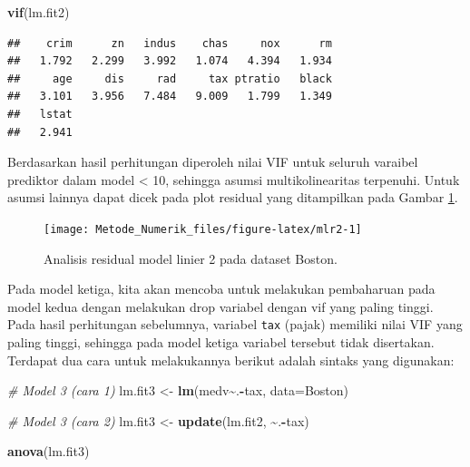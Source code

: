 \documentclass[
]{book}
\newenvironment{Shaded}{\begin{snugshade}}{\end{snugshade}}
\newcommand{\AttributeTok}[1]{\textcolor[rgb]{0.13,0.29,0.53}{#1}}
\newcommand{\CommentTok}[1]{\textcolor[rgb]{0.56,0.35,0.01}{\textit{#1}}}
\newcommand{\FunctionTok}[1]{\textcolor[rgb]{0.13,0.29,0.53}{\textbf{#1}}}
\newcommand{\NormalTok}[1]{#1}
\newcommand{\OtherTok}[1]{\textcolor[rgb]{0.56,0.35,0.01}{#1}}
\newcommand{\SpecialCharTok}[1]{\textcolor[rgb]{0.81,0.36,0.00}{\textbf{#1}}}
\theoremstyle{definition}
\theoremstyle{definition}
\theoremstyle{definition}
\theoremstyle{definition}
\theoremstyle{remark}
\begin{document}
\begin{Shaded}
\begin{Highlighting}[]
\FunctionTok{vif}\NormalTok{(lm.fit2)}
\end{Highlighting}
\end{Shaded}

\begin{verbatim}
##    crim      zn   indus    chas     nox      rm 
##   1.792   2.299   3.992   1.074   4.394   1.934 
##     age     dis     rad     tax ptratio   black 
##   3.101   3.956   7.484   9.009   1.799   1.349 
##   lstat 
##   2.941
\end{verbatim}

Berdasarkan hasil perhitungan diperoleh nilai VIF untuk seluruh varaibel prediktor dalam model \textless{} 10, sehingga asumsi multikolinearitas terpenuhi. Untuk asumsi lainnya dapat dicek pada plot residual yang ditampilkan pada Gambar \ref{fig:mlr2}.

\begin{figure}

{\centering \texttt{[image: Metode\_Numerik\_files/figure-latex/mlr2-1]} 

}

\caption{Analisis residual model linier 2 pada dataset Boston.}\label{fig:mlr2}
\end{figure}

Pada model ketiga, kita akan mencoba untuk melakukan pembaharuan pada model kedua dengan melakukan drop variabel dengan vif yang paling tinggi. Pada hasil perhitungan sebelumnya, variabel \texttt{tax} (pajak) memiliki nilai VIF yang paling tinggi, sehingga pada model ketiga variabel tersebut tidak disertakan. Terdapat dua cara untuk melakukannya berikut adalah sintaks yang digunakan:

\begin{Shaded}
\begin{Highlighting}[]
\CommentTok{\# Model 3 (cara 1)}
\NormalTok{lm.fit3 }\OtherTok{\textless{}{-}} \FunctionTok{lm}\NormalTok{(medv}\SpecialCharTok{\textasciitilde{}}\NormalTok{.}\SpecialCharTok{{-}}\NormalTok{tax, }\AttributeTok{data=}\NormalTok{Boston)}

\CommentTok{\# Model 3 (cara 2)}
\NormalTok{lm.fit3 }\OtherTok{\textless{}{-}} \FunctionTok{update}\NormalTok{(lm.fit2, }\SpecialCharTok{\textasciitilde{}}\NormalTok{.}\SpecialCharTok{{-}}\NormalTok{tax)}

\FunctionTok{anova}\NormalTok{(lm.fit3)}
\end{Highlighting}
\end{Shaded}
\end{document}
